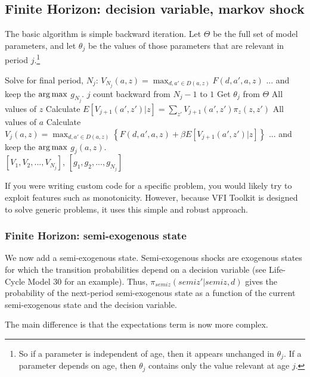 \subsection{Finite Horizon: decision variable, markov shock}
The basic algorithm is simple backward iteration. Let $\Theta$ be the full set of model parameters, and let $\theta_j$ be the values of those parameters that are relevant in period $j$.\footnote{So if a parameter is independent of age, then it appears unchanged in $\theta_j$. If a parameter depends on age, then $\theta_j$ contains only the value relevant at age $j$.}
\begin{algorithmic}
 \State Solve for final period, $N_j$: $V_{N_j}(a,z)=\max_{d,a' \in D(a,z)} F(d,a',a,z) $
 \State ... and keep the $\operatorname*{arg\,max}$ $g_{N_j}$.
 \For $j$ count backward from $N_j-1$ to $1$
   \State Get $\theta_j$ from $\Theta$
   \For All values of $z$
    \State Calculate $E[V_{j+1}(a',z')|z]=\sum_{z'} V_{j+1}(a',z') \pi_z(z,z')$
    \For All values of $a$
     \State Calculate $V_j(a,z)=\max_{d,a' \in D(a,z)} \left\{ F(d,a',a,z)+\beta E[V_{j+1}(a',z')|z] \right\}$
     \State ... and keep the $\operatorname*{arg\,max}$ $g_j(a,z)$.
     \EndFor
   \EndFor
  \EndFor
   \\ \Return $[V_1,V_2,...,V_{N_j}]$, $[g_1,g_2,...,g_{N_j}]$
\end{algorithmic}

If you were writing custom code for a specific problem, you would likely try to exploit features such as monotonicity. However, because VFI Toolkit is designed to solve generic problems, it uses this simple and robust approach.

\subsubsection{Finite Horizon: semi-exogenous state}
We now add a semi-exogenous state. Semi-exogenous shocks are exogenous states for which the transition probabilities depend on a decision variable (see Life-Cycle Model 30 for an example). Thus, $\pi_{semiz}(semiz'|semiz,d)$ gives the probability of the next-period semi-exogenous state as a function of the current semi-exogenous state and the decision variable.

The main difference is that the expectations term is now more complex.

